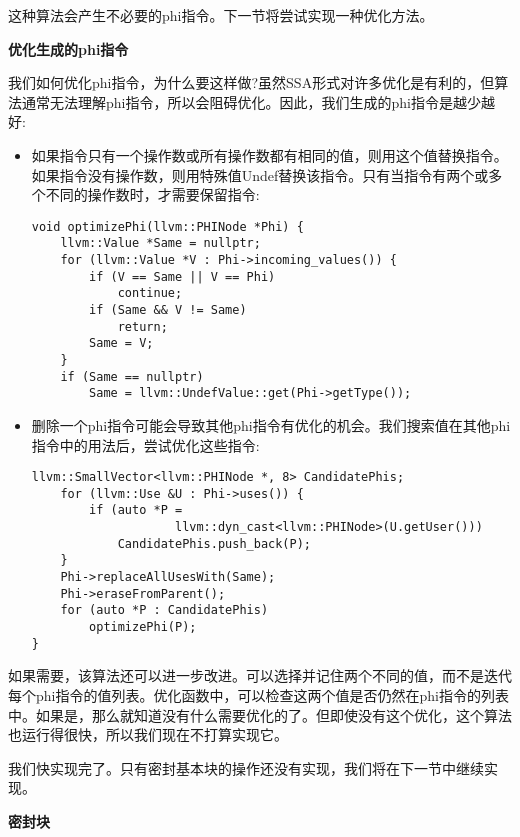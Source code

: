 这种算法会产生不必要的phi指令。下一节将尝试实现一种优化方法。\par

\hspace*{\fill} \par %
\textbf{优化生成的phi指令}

我们如何优化phi指令，为什么要这样做?虽然SSA形式对许多优化是有利的，但算法通常无法理解phi指令，所以会阻碍优化。因此，我们生成的phi指令是越少越好:\par

\begin{itemize}
\item 如果指令只有一个操作数或所有操作数都有相同的值，则用这个值替换指令。如果指令没有操作数，则用特殊值Undef替换该指令。只有当指令有两个或多个不同的操作数时，才需要保留指令:
\begin{lstlisting}[caption={}]
void optimizePhi(llvm::PHINode *Phi) {
	llvm::Value *Same = nullptr;
	for (llvm::Value *V : Phi->incoming_values()) {
		if (V == Same || V == Phi)
			continue;
		if (Same && V != Same)
			return;
		Same = V;
	}
	if (Same == nullptr)
		Same = llvm::UndefValue::get(Phi->getType());
\end{lstlisting}

\item 删除一个phi指令可能会导致其他phi指令有优化的机会。我们搜索值在其他phi指令中的用法后，尝试优化这些指令:
\begin{lstlisting}[caption={}]
	llvm::SmallVector<llvm::PHINode *, 8> CandidatePhis;
	for (llvm::Use &U : Phi->uses()) {
		if (auto *P =
					llvm::dyn_cast<llvm::PHINode>(U.getUser()))
			CandidatePhis.push_back(P);
	}
	Phi->replaceAllUsesWith(Same);
	Phi->eraseFromParent();
	for (auto *P : CandidatePhis)
		optimizePhi(P);
}
\end{lstlisting}

\end{itemize}

如果需要，该算法还可以进一步改进。可以选择并记住两个不同的值，而不是迭代每个phi指令的值列表。优化函数中，可以检查这两个值是否仍然在phi指令的列表中。如果是，那么就知道没有什么需要优化的了。但即使没有这个优化，这个算法也运行得很快，所以我们现在不打算实现它。\par

我们快实现完了。只有密封基本块的操作还没有实现，我们将在下一节中继续实现。\par

\hspace*{\fill} \par %
\textbf{密封块}


